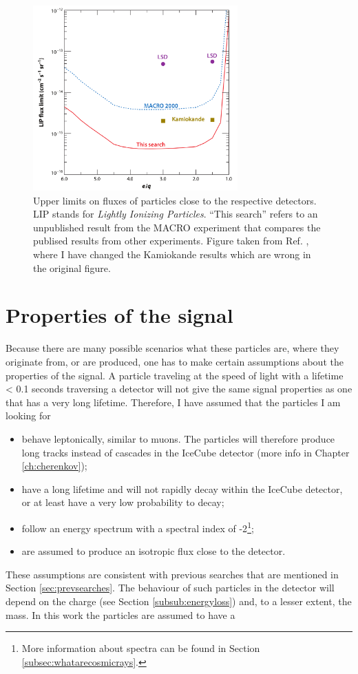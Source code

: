 \begin{figure}
\centering
\includegraphics[width=0.7\textwidth]{chapter2/img/upperlimits_changed.png}
\caption{Upper limits on fluxes of particles close to the respective detectors. LIP stands for \textit{Lightly Ionizing Particles}. ``This search'' refers to an unpublished result from the MACRO experiment that compares the publised results from other experiments. Figure taken from Ref. \cite{Ambrosio:2004ub}, where I have changed the Kamiokande results which are wrong in the original figure.}
\label{fig:upperlimits}
\end{figure}


\section{Properties of the signal}
\label{sec:properties}
Because there are many possible scenarios what these particles are, where they originate from, or are produced, one has to make certain assumptions about the properties of the signal. A particle traveling at the speed of light with a lifetime < 0.1 seconds traversing a detector will not give the same signal properties as one that has a very long lifetime. Therefore, I have assumed that the particles I am looking for

\begin{itemize}
\item behave leptonically, similar to muons. The particles will therefore produce long tracks instead of cascades in the IceCube detector (more info in Chapter \ref{ch:cherenkov});
\item have a long lifetime and will not rapidly decay within the IceCube detector, or at least have a very low probability to decay;
\item follow an energy spectrum with a spectral index of -2\footnote{More information about spectra can be found in Section \ref{subsec:whatarecosmicrays}.};
\item are assumed to produce an isotropic flux close to the detector.
\end{itemize}
These assumptions are consistent with previous searches that are mentioned in Section \ref{sec:prevsearches}. The behaviour of such particles in the detector will depend on the charge (see Section \ref{subsub:energyloss}) and, to a lesser extent, the mass. In this work the particles are assumed to have a

